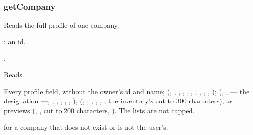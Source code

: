 \subsubsection{getCompany}\label{sec:tools:getCompany}
\begin{description}[style=multiline, leftmargin=19mm, labelwidth=17mm, labelsep=2mm,
  font=\sffamily\bfseries\footnotesize\color{ink}, itemsep=1pt, topsep=2pt, before=\raggedright]
  \item[Does] Reads the full profile of one company.
  \item[Input] : an id.
  \item[Calls] .
  \item[Kind] Reads.
  \item[Returns] Every profile field, without the owner's id and name; 
    (, , , , , ,
    , , , , );
     (, ,  --- the designation ---,
    , , , , , );
     (, , , ,
    , , the inventory's  cut to 300
    characters);  as previews (, ,  cut to 200
    characters, ). The lists are not capped.
  \item[Errors]  for a company that does not exist or is not the user's.
\end{description}


